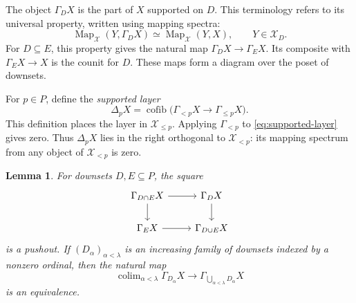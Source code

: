 \documentclass[11pt,reqno]{amsart}
\newtheorem{lemma}[theorem]{Lemma}
\theoremstyle{definition}
\theoremstyle{remark}
\theoremstyle{plain}
\numberwithin{equation}{section}
\DeclareMathOperator{\Map}{Map}
\DeclareMathOperator{\cofib}{cofib}
\DeclareMathOperator*{\colim}{colim}
\begin{document}
The object \(\Gamma_DX\) is the part of \(X\) supported on \(D\).
This terminology refers to its universal property, written using
mapping spectra:
\[
 \Map_{\mathcal X}(Y,\Gamma_DX)
 \simeq
 \Map_{\mathcal X}(Y,X),
 \qquad Y\in\mathcal X_D.
\]
For \(D\subseteq E\), this property gives the natural map
\(\Gamma_DX\to\Gamma_EX\). Its composite with
\(\Gamma_EX\to X\) is the counit for \(D\).
These maps form a diagram over the poset of downsets.

For \(p\in P\), define the \emph{supported layer}
\begin{equation}
\label{eq:supported-layer}
 \Delta_pX
 =
 \cofib\bigl(\Gamma_{<p}X\longrightarrow\Gamma_{\leq p}X\bigr).
\end{equation}
This definition places the layer in \(\mathcal X_{\leq p}\).
Applying \(\Gamma_{<p}\) to
\eqref{eq:supported-layer} gives zero. Thus \(\Delta_pX\) lies in
the right orthogonal to \(\mathcal X_{<p}\): its mapping spectrum from
any object of \(\mathcal X_{<p}\) is zero.

\begin{lemma}
\label{lem:filtration-excision}
For downsets \(D,E\subseteq P\), the square
\[
\begin{tikzcd}
 \Gamma_{D\cap E}X \arrow[r] \arrow[d]
   & \Gamma_DX \arrow[d]\\
 \Gamma_EX \arrow[r]
   & \Gamma_{D\cup E}X
\end{tikzcd}
\]
is a pushout.
If \((D_\alpha)_{\alpha<\lambda}\) is an increasing family of downsets
indexed by a nonzero ordinal, then the natural map
\begin{equation}
\label{eq:filtration-continuity}
 \colim_{\alpha<\lambda}\Gamma_{D_\alpha}X
 \longrightarrow
 \Gamma_{\bigcup_{\alpha<\lambda}D_\alpha}X
\end{equation}
is an equivalence.
\end{lemma}
\end{document}
